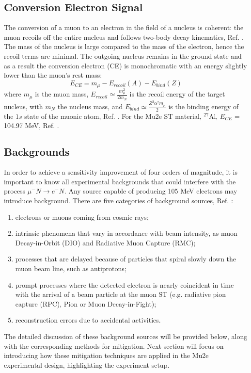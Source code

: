 \subsection{Conversion Electron Signal}
The conversion of a muon to an electron in the field of a nucleus is coherent: 
the muon recoils off the entire nucleus and follows two-body decay kinematics, 
Ref. \cite{bartoszek2015mu2e}. The mass of the nucleus is large compared to the 
mass of the electron, hence the recoil terms are minimal. The outgoing nucleus 
remains in the ground state and as a result the conversion electron (CE) is 
monochromatic with an energy slightly lower than the muon's rest mass:
\begin{equation}
    E_{CE} = m_\mu - E_{recoil}(A) - E_{bind}(Z) 
\end{equation}
where $m_\mu$ is the muon mass, $E_{recoil}\simeq \frac{m^2_\mu}{2 m_N}$ is 
the recoil energy of the target nucleus, with $m_N$ the nucleus mass, and 
$E_{bind}\simeq \frac{Z^2 \alpha^2 m_\mu}{2}$ is the binding energy of the 
$1s$ state of the muonic atom, Ref. \cite{universe9010054}. For the Mu2e 
ST material, $^{27}$Al, $E_{CE}$ = 104.97 MeV, Ref. \cite{PhysRevD.84.013006}.
\subsection{Backgrounds}\label{backgrounds}
In order to achieve a sensitivity improvement of four orders of magnitude, 
it is important to know all experimental backgrounds that could interfere with 
the process $\mu^- N \rightarrow e^- N $. Any source capable of producing 105 MeV 
electrons may introduce background. There are five categories of background sources, Ref. \cite{bartoszek2015mu2e}:
\begin{enumerate}
\item electrons or muons coming from cosmic rays;
\item intrinsic phenomena that vary in accordance with beam intensity, as muon Decay-in-Orbit (DIO) and Radiative Muon Capture (RMC);
\item processes that are delayed because of particles that spiral slowly down the muon beam line, such as antiprotons;
\item prompt processes where the detected electron is nearly coincident in time with the arrival of a beam particle at the muon ST (e.g. radiative pion capture (RPC), Pion or Muon Decay-in-Fight);
\item reconstruction errors due to accidental activities.
\end{enumerate}
The detailed discussion of these background sources will be provided below, along with the corresponding methods for mitigation. Next section will focus on introducing how these mitigation techniques are applied in the Mu2e experimental design, highlighting the experiment setup.
